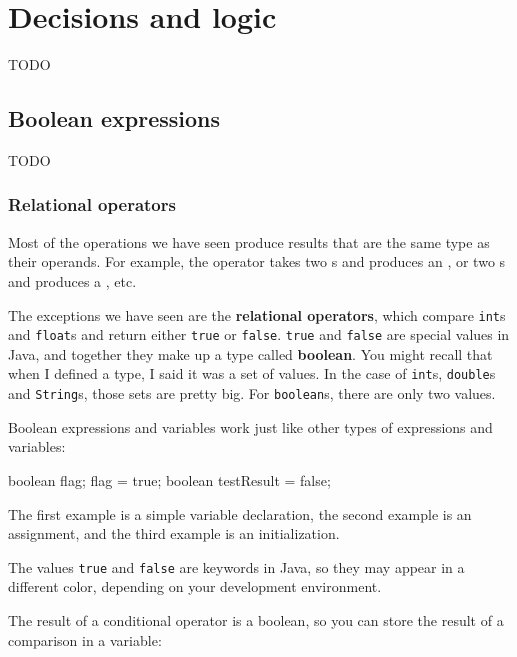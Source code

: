 \documentclass[12pt]{book}
\begin{document}
\chapter{Decisions and logic}
TODO


\section{Boolean expressions}
TODO

\subsection{Relational operators}


Most of the operations we have seen produce results that are the same type as their operands.
For example, the \java{+} operator takes two s and produces an , or two s and produces a , etc.


The exceptions we have seen are the {\bf relational operators}, which compare {\tt int}s and {\tt float}s and return either {\tt true} or {\tt false}.
{\tt true} and {\tt false} are special values in Java, and together they make up a type called {\bf boolean}.
You might recall that when I defined a type, I said it was a set of values.
In the case of {\tt int}s, {\tt double}s and {\tt String}s, those sets are pretty big.
For {\tt boolean}s, there are only two values.

Boolean expressions and variables work just like other types of expressions and variables:

\begin{code}
    boolean flag;
    flag = true;
    boolean testResult = false;
\end{code}

The first example is a simple variable declaration, the second example is an assignment, and the third example is an initialization.

The values {\tt true} and {\tt false} are keywords in Java, so they may appear in a different color, depending on your development environment.


The result of a conditional operator is a boolean, so you can store the result of a comparison in a variable:
\end{document}
